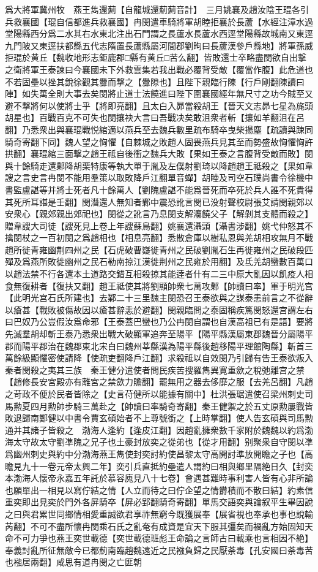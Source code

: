 爲大將軍冀州牧　燕王雋還薊【自龍城還薊薊音計】　三月姚襄及趙汝陰王琨各引兵救襄國【琨自信都進兵救襄國】冉閔遣車騎將軍胡睦拒襄於長蘆【水經注漳水過堂陽縣西分爲二水其右水東北注出石門謂之長蘆水長蘆水西逕堂陽縣故城南又東逕九門陂又東逕扶都縣五代志隋置長蘆縣屬河間郡劉昫曰長蘆漢參戶縣地】將軍孫威拒琨於黄丘【魏收地形志鉅鹿郡□縣有黄丘□苦么翻】皆敗還士卒略盡閔欲自出撃之衛將軍王泰諫曰今襄國未下外救雲集若我出戰必覆背受敵【覆當作腹】此危道也不若固壘以挫其銳徐觀其釁而撃之【釁隙也】且陛下親臨行陳【行戶剛翻陳讀曰陣】如失萬全則大事去矣閔將止道士法饒進曰陛下圍襄國經年無尺寸之功今賊至又避不撃將何以使將士乎【將即亮翻】且太白入昴當殺胡王【晉天文志昴七星為旄頭胡星也】百戰百克不可失也閔攘袂大言曰吾戰决矣敢沮衆者斬【攘如羊翻沮在呂翻】乃悉衆出與襄琨戰悦綰適以燕兵至去魏兵數里疏布騎卒曳柴揚塵【疏讀與踈同騎奇寄翻下同】魏人望之恟懼【自棘城之敗趙人固畏燕兵見其至而勢盛故恟懼恟許拱翻】襄琨綰三面撃之趙王祗自後衝之魏兵大敗【果如王泰之言腹背受敵而敗】閔與十餘騎走還鄴降胡栗特康等執大單于胤及左僕射劉琦以降趙趙王祗殺之【果如韋謏之言史言冉閔不能用羣策以取敗降戶江翻單音蟬】胡睦及司空石璞尚書令徐機中書監盧諶等并將士死者凡十餘萬人【劉隗盧諶不能爲晉死而卒死於兵人誰不死貴得其死所耳諶是壬翻】閔潛還人無知者鄴中震恐訛言閔已没射聲校尉張艾請閔親郊以安衆心【親郊親出郊祀也】閔從之訛言乃息閔支解灋饒父子【解剝其支體而殺之】贈韋謏大司徒【謏死見上卷上年謏蘇鳥翻】姚襄還灄頭【灄書涉翻】姚弋仲怒其不擒閔杖之一百初閔之爲趙相也【相息亮翻】悉散倉庫以樹私恩與羌胡相攻無月不戰趙所徙青雍幽荆四州之民【石虎破曹嶷徙青州之民破劉胤石生再徙雍州之民破段匹殫及爲燕所敗徙幽州之民石勒南掠江漢徙荆州之民雍於用翻】及氐羌胡蠻數百萬口以趙法禁不行各還本土道路交錯互相殺掠其能逹者什有二三中原大亂因以飢疫人相食無復耕者【復扶又翻】趙王祗使其將劉顯帥衆七萬攻鄴【帥讀曰率】軍于明光宫【此明光宫石氏所建也】去鄴二十三里魏主閔恐召王泰欲與之謀泰恚前言之不從辭以瘡甚【戰敗被傷故因以瘡甚辭恚於避翻】閔親臨問之泰固稱疾篤閔怒還宫謂左右曰巴奴乃公豈假汝爲命邪【王泰蓋巴蠻也乃公冉閔自謂也自漢高祖已有是語】要將先滅羣胡却斬王泰乃悉衆出戰大破顯軍追奔至陽平【陽平縣漢屬東郡魏晉分屬陽平郡而陽平郡治在魏郡東北宋白曰魏州莘縣漢為陽平縣後趙移陽平理館陶縣】斬首三萬餘級顯懼密使請降【使疏吏翻降戶江翻】求殺祗以自效閔乃引歸有告王泰欲叛入秦者閔殺之夷其三族　秦王健分遣使者問民疾苦搜羅雋異寛重歛之稅弛離宫之禁【趙修長安宮殿亦有離宮之禁歛力贍翻】罷無用之器去侈靡之服【去羌呂翻】凡趙之苛政不便於民者皆除之【史言苻健所以能據有關中】杜洪張琚遣使召梁州刺史司馬勲夏四月勲帥步騎三萬赴之【帥讀曰率騎奇寄翻】秦王健禦之於五丈原勲屢戰皆敗退歸南鄭健以中書令賈玄碩始者不上尊號銜之【上時掌翻】使人告玄碩與司馬勲通并其諸子皆殺之　渤海人逢約【逢皮江翻】因趙亂擁衆數千家附於魏魏以約爲渤海太守故太守劉凖隗之兄子也土豪封放奕之從弟也【從才用翻】别聚衆自守閔以凖爲幽州刺史與約中分渤海燕王雋使封奕討約使昌黎太守高開討準放開瞻之子也【高瞻見九十一卷元帝太興二年】奕引兵直抵約壘遣人謂約曰相與鄉里隔絶日久【封奕本渤海人懷帝永嘉五年託於慕容廆見八十七卷】會遇甚難時事利害人皆有心非所論也願單出一相見以寫佇結之情【人立而待之曰佇企望之情欝積而不散曰結】約素信重奕即出見奕於門外各屏騎卒【屏必郢翻騎奇寄翻】單馬交語奕與論叙平生畢因說之曰與君累世同鄉情相愛重誠欲君享祚無窮今既獲展奉【展省視也奉承也事也說輸芮翻】不可不盡所懷冉閔乘石氏之亂奄有成資是宜天下服其彊矣而禍亂方始固知天命不可力爭也燕王奕世載德【奕世載德班彪王命論之言師古曰載乘也言相因不絶】奉義討亂所征無敵今已都薊南臨趙魏遠近之民襁負歸之民厭荼毒【孔安國曰荼毒苦也襁居兩翻】咸思有道冉閔之亡匪朝